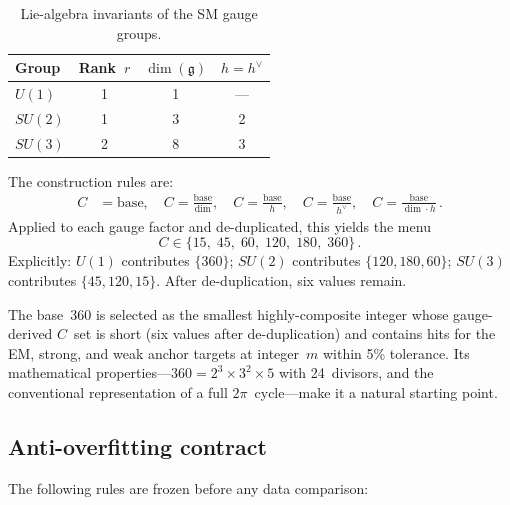 \documentclass[12pt,a4paper]{article}
\begin{document}
\begin{table}[h]
\centering
\caption{Lie-algebra invariants of the SM gauge groups.}
\label{tab:invariants}
\begin{tabular}{@{}lccc@{}}
\toprule
Group & Rank~$r$ & $\dim(\mathfrak{g})$ & $h = h^\vee$ \\
\midrule
$U(1)$  & 1 & 1 & --- \\
$SU(2)$ & 1 & 3 & 2   \\
$SU(3)$ & 2 & 8 & 3   \\
\bottomrule
\end{tabular}
\end{table}

The construction rules are:
\begin{align}
  C &= \mathrm{base}, \quad
  C = \frac{\mathrm{base}}{\dim}, \quad
  C = \frac{\mathrm{base}}{h}, \quad
  C = \frac{\mathrm{base}}{h^\vee}, \quad
  C = \frac{\mathrm{base}}{\dim \cdot h}\,.
\end{align}
Applied to each gauge factor and de-duplicated, this yields the menu
\begin{equation}
  \boxed{C \in \{15,\; 45,\; 60,\; 120,\; 180,\; 360\}}\,.
  \label{eq:cmenu}
\end{equation}
Explicitly: $U(1)$ contributes $\{360\}$; $SU(2)$ contributes
$\{120, 180, 60\}$; $SU(3)$ contributes $\{45, 120, 15\}$.  After
de-duplication, six values remain.

The base~360 is selected as the smallest highly-composite integer whose
gauge-derived $C$~set is short (six values after de-duplication) and contains
hits for the EM, strong, and weak anchor targets at integer~$m$ within 5\%
tolerance.  Its mathematical properties---$360 = 2^3 \times 3^2 \times 5$
with 24~divisors, and the conventional representation of a full
$2\pi$~cycle---make it a natural starting point.

\subsection{Anti-overfitting contract}
\label{sec:contract}

The following rules are frozen before any data comparison:
\end{document}
